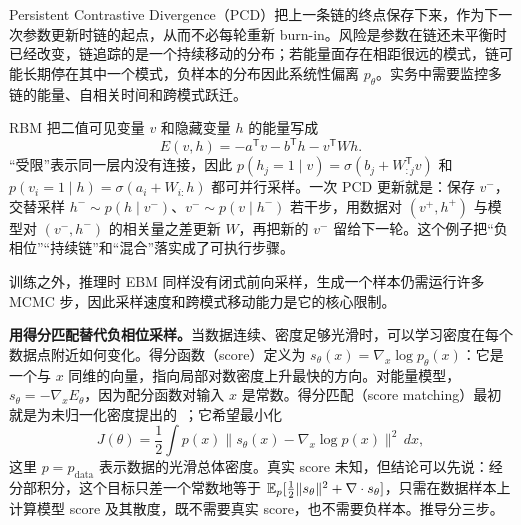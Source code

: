 Persistent Contrastive Divergence（PCD）把上一条链的终点保存下来，作为下一次参数更新时链的起点，从而不必每轮重新 burn-in。风险是参数在链还未平衡时已经改变，链追踪的是一个持续移动的分布；若能量面存在相距很远的模式，链可能长期停在其中一个模式，负样本的分布因此系统性偏离 \(p_\theta\)。实务中需要监控多链的能量、自相关时间和跨模式跃迁。

\begin{examplebox}
RBM 把二值可见变量 \(v\) 和隐藏变量 \(h\) 的能量写成
\begin{equation}
E(v,h)=-a^\mathsf Tv-b^\mathsf Th-v^\mathsf TWh.
\end{equation}
“受限”表示同一层内没有连接，因此 \(p(h_j=1\mid v)=\sigma(b_j+W_{:j}^\mathsf Tv)\) 和 \(p(v_i=1\mid h)=\sigma(a_i+W_{i:}h)\) 都可并行采样。一次 PCD 更新就是：保存 \(v^-\)，交替采样 \(h^-\sim p(h\mid v^-)\)、\(v^-\sim p(v\mid h^-)\) 若干步，用数据对 \((v^+,h^+)\) 与模型对 \((v^-,h^-)\) 的相关量之差更新 \(W\)，再把新的 \(v^-\) 留给下一轮。这个例子把“负相位”“持续链”和“混合”落实成了可执行步骤。
\end{examplebox}

训练之外，推理时 EBM 同样没有闭式前向采样，生成一个样本仍需运行许多 MCMC 步，因此采样速度和跨模式移动能力是它的核心限制。

\textbf{用得分匹配替代负相位采样。}当数据连续、密度足够光滑时，可以学习密度在每个数据点附近如何变化。得分函数（score）定义为 \(s_\theta(x)=\nabla_x\log p_\theta(x)\)：它是一个与 \(x\) 同维的向量，指向局部对数密度上升最快的方向。对能量模型，\(s_\theta=-\nabla_xE_\theta\)，因为配分函数对输入 \(x\) 是常数。得分匹配（score matching）最初就是为未归一化密度提出的~\cite{hyvarinen2005score}；它希望最小化
\begin{equation}
 J(\theta)=\frac12\int p(x)\|s_\theta(x)-\nabla_x\log p(x)\|^2\,dx,
 \label{eq:score-matching-target}
\end{equation}
这里 \(p=p_{\mathrm{data}}\) 表示数据的光滑总体密度。真实 score 未知，但结论可以先说：经分部积分，这个目标只差一个常数地等于 \(\mathbb{E}_p[\tfrac12\|s_\theta\|^2+\nabla\cdot s_\theta]\)，只需在数据样本上计算模型 score 及其散度，既不需要真实 score，也不需要负样本。推导分三步。

